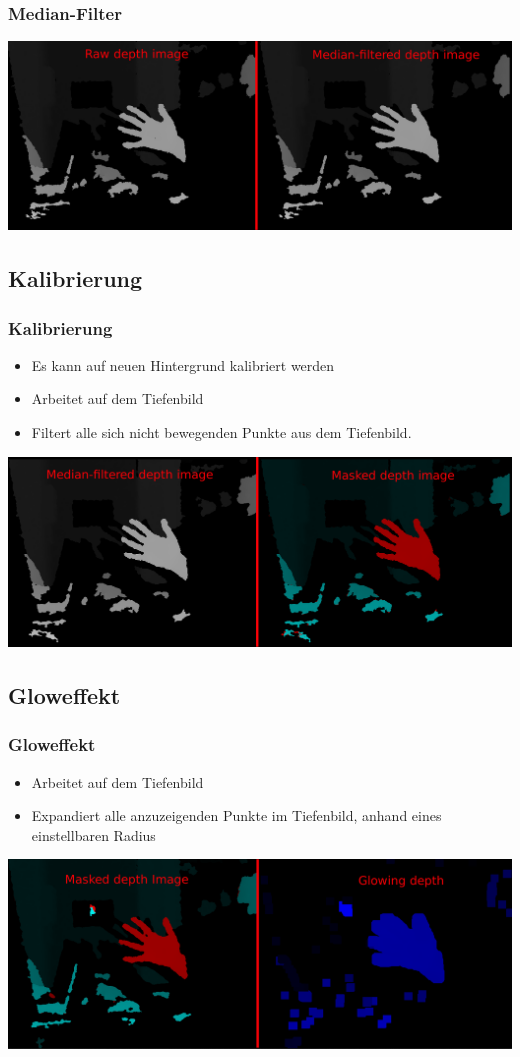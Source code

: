 \documentclass[compress]{beamer}
\begin{document}
\begin{frame}
\frametitle{Median-Filter}
\includegraphics[width=\textwidth]{filter1.png}
\end{frame}

\subsection{Kalibrierung}
\begin{frame}
\frametitle{Kalibrierung}
\begin{itemize}
	\item Es kann auf neuen Hintergrund kalibriert werden
	\item Arbeitet auf dem Tiefenbild
	\item Filtert alle sich nicht bewegenden Punkte aus dem Tiefenbild.
\end{itemize}
\includegraphics[width=\textwidth]{filter2.png}
\end{frame}

\subsection{Gloweffekt}
\begin{frame}
\frametitle{Gloweffekt}
\begin{itemize}
	\item Arbeitet auf dem Tiefenbild
	\item Expandiert alle anzuzeigenden Punkte im Tiefenbild, anhand eines einstellbaren Radius
\end{itemize}
\vspace*{0.5cm}
\includegraphics[width=\textwidth]{filter3.png}
\end{frame}
\end{document}
